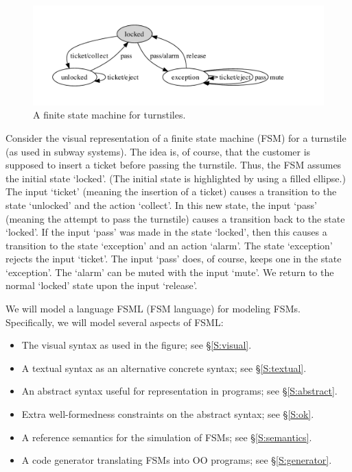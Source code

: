 \documentclass[preprint,authoryear,12pt]{noelsarticle}
\begin{document}

\begin{figure}[t!]
\vspace{-77\in}
\includegraphics[width=\textwidth]{../../languages/fsml/sample.pdf}
\vspace{-150\in}
\caption{A finite state machine for turnstiles.}
\label{F:turnstile}
\end{figure}


Consider the visual representation of a finite state machine (FSM) for
a turnstile (as used in subway systems). The idea is, of course, that
the customer is supposed to insert a ticket before passing the
turnstile. Thus, the FSM assumes the initial state `locked'. (The
initial state is highlighted by using a filled ellipse.) The input
`ticket' (meaning the insertion of a ticket) causes a transition to
the state `unlocked' and the action `collect'. In this new state, the
input `pass' (meaning the attempt to pass the turnstile) causes a
transition back to the state `locked'. If the input `pass' was made in
the state `locked', then this causes a transition to the state
`exception' and an action `alarm'. The state `exception' rejects the
input `ticket'. The input `pass' does, of course, keeps one in the
state `exception'. The `alarm' can be muted with the input `mute'. We
return to the normal `locked' state upon the input `release'.

We will model a language FSML (FSM language) for modeling
FSMs. Specifically, we will model several aspects of FSML:

\begin{itemize}
\item The visual syntax as used in the figure; see \S\ref{S:visual}.
\item A textual syntax as an alternative concrete syntax; see \S\ref{S:textual}.
\item An abstract syntax useful for representation in programs; see \S\ref{S:abstract}.
\item Extra well-formedness constraints on the abstract syntax; see \S\ref{S:ok}.
\item A reference semantics for the simulation of FSMs; see \S\ref{S:semantics}.
\item A code generator translating FSMs into OO programs; see \S\ref{S:generator}.
\end{itemize}
\end{document}
